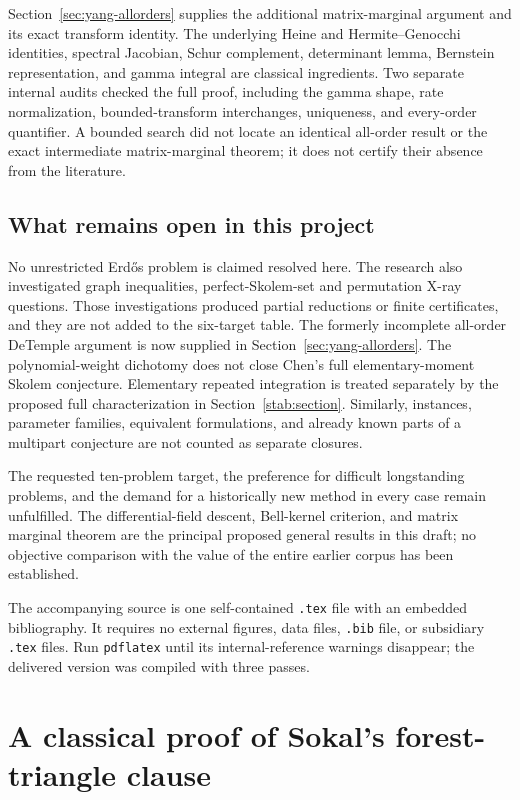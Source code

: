 \documentclass[11pt,a4paper]{article}
\theoremstyle{definition}
\theoremstyle{remark}
\numberwithin{equation}{section}
\begin{document}
Section~\ref{sec:yang-allorders} supplies the additional matrix-marginal
argument and its exact transform identity. The underlying Heine and
Hermite--Genocchi identities, spectral Jacobian, Schur complement,
determinant lemma, Bernstein representation, and gamma integral are
classical ingredients. Two separate internal audits checked the full
proof, including the gamma shape, rate normalization, bounded-transform
interchanges, uniqueness, and every-order quantifier. A bounded search
did not locate an identical all-order result or the exact intermediate
matrix-marginal theorem; it does not certify their absence from the
literature.

\subsection{What remains open in this project}

No unrestricted Erd\H{o}s problem is claimed resolved here. The research
also investigated graph inequalities, perfect-Skolem-set and permutation
X-ray questions. Those investigations produced partial reductions or
finite certificates, and they are not added to the six-target table.
The formerly incomplete all-order DeTemple argument is now supplied
in Section~\ref{sec:yang-allorders}. The polynomial-weight dichotomy
does not close Chen's full elementary-moment Skolem conjecture. Elementary repeated integration is treated
separately by the proposed full characterization in Section~\ref{stab:section}. Similarly,
instances, parameter families, equivalent formulations, and already known
parts of a multipart conjecture are not counted as separate closures.

The requested ten-problem target, the preference for difficult longstanding
problems, and the demand for a historically new method in every case remain
unfulfilled. The differential-field descent, Bell-kernel criterion, and matrix marginal
theorem are the principal proposed general results in this draft; no objective comparison with the value of
the entire earlier corpus has been established.

The accompanying source is one self-contained \texttt{.tex} file with an
embedded bibliography. It requires no external figures, data files,
\texttt{.bib} file, or subsidiary \texttt{.tex} files. Run
\texttt{pdflatex} until its internal-reference warnings disappear;
the delivered version was compiled with three passes.

\appendix
\section{A classical proof of Sokal's forest-triangle clause}
\label{app:forest-triangle}
\end{document}
